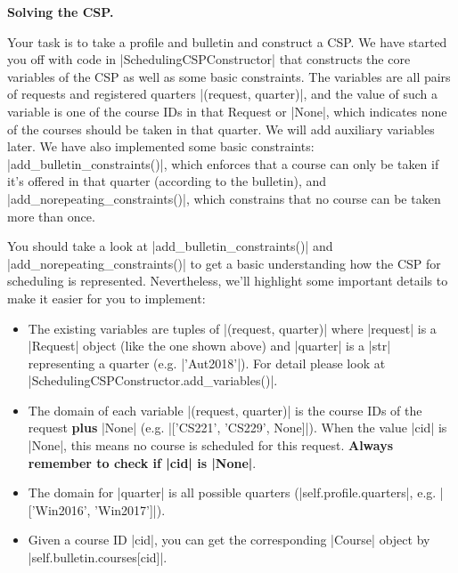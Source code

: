 {\bf Solving the CSP.}

Your task is to take a profile and bulletin and construct a CSP. We have started
you off with code in |SchedulingCSPConstructor| that constructs the core
variables of the CSP as well as some basic constraints. The variables are all
pairs of requests and registered quarters |(request, quarter)|, and the value of
such a variable is one of the course IDs in that Request or |None|, which
indicates none of the courses should be taken in that quarter. We will add
auxiliary variables later. We have also implemented some basic constraints:
|add_bulletin_constraints()|, which enforces that a course can only be taken if
it's offered in that quarter (according to the bulletin), and
|add_norepeating_constraints()|, which constrains that no course can be taken
more than once.

You should take a look at |add_bulletin_constraints()| and 
|add_norepeating_constraints()| to get a basic understanding how the CSP for
scheduling is represented. Nevertheless, we'll highlight some important details
to make it easier for you to implement:



\begin{itemize}
  \item The existing variables are tuples of |(request, quarter)| where
  |request| is a |Request| object (like the one shown above) and |quarter| is a
  |str| representing a quarter (e.g. |'Aut2018'|). For detail please look at
  |SchedulingCSPConstructor.add_variables()|.
  
  \item The domain of each variable |(request, quarter)| is the course IDs of
  the request {\bf plus} |None| (e.g. |['CS221', 'CS229', None]|). When the
  value |cid| is |None|, this means no course is scheduled for this request.
  {\bf Always remember to check if |cid| is |None|}.
  
  \item The domain for |quarter| is all possible quarters
  (|self.profile.quarters|, e.g. |['Win2016', 'Win2017']|).
  
  \item Given a course ID |cid|, you can get the corresponding |Course| object
  by |self.bulletin.courses[cid]|.
\end{itemize}

\begin{enumerate}

  

  

  

  

\end{enumerate}
